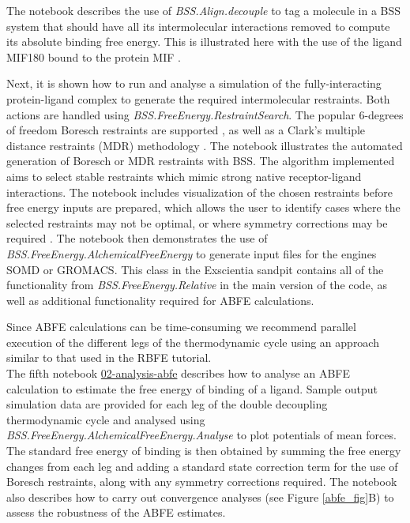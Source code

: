 The notebook describes the use of \textit{BSS.Align.decouple} to tag a molecule in a BSS system that should have all its intermolecular interactions removed to compute its absolute binding free energy. This is illustrated here with the use of the ligand MIF180 bound to the protein MIF \cite{Qian2019, Clark2023}. 

Next, it is shown how to run and analyse a simulation of the fully-interacting protein-ligand complex to generate the required intermolecular restraints. Both actions are handled using \textit{BSS.FreeEnergy.RestraintSearch}. The popular 6-degrees of freedom Boresch restraints are supported \cite{boresch_absolute_2003}, as well as a Clark's multiple distance restraints (MDR) methodology \cite{Clark2023}.
The notebook illustrates the automated generation of Boresch or MDR restraints with BSS. The algorithm implemented aims to select stable restraints which mimic strong native receptor-ligand interactions. The notebook includes visualization of the chosen restraints before free energy inputs are prepared, which allows the user to identify cases where the selected restraints may not be optimal, or where symmetry corrections may be required \cite{duboue-dijon_building_2021}. The notebook then demonstrates the use of \textit{BSS.FreeEnergy.AlchemicalFreeEnergy} to generate input files for the engines SOMD or GROMACS. This class in the Exscientia sandpit contains all of the functionality from \textit{BSS.FreeEnergy.Relative} in the main version of the code, as well as additional functionality required for ABFE calculations.

Since ABFE calculations can be time-consuming we recommend parallel execution of the different legs of the thermodynamic cycle using an approach similar to that used in the RBFE tutorial.
\\

The fifth notebook \href{https://github.com/OpenBioSim/biosimspace_tutorials/blob/main/04_fep/03_ABFE/02_analysis_abfe.ipynb}{02-analysis-abfe} describes how to analyse an ABFE calculation to estimate the free energy of binding of a ligand. Sample output simulation data are provided for each leg of the double decoupling thermodynamic cycle and analysed using \textit{BSS.FreeEnergy.AlchemicalFreeEnergy.Analyse} to plot potentials of mean forces. The standard free energy of binding is then obtained by summing the free energy changes from each leg and adding a standard state correction term for the use of Boresch restraints, along with any symmetry corrections required. The notebook also describes how to carry out convergence analyses (see Figure \ref{abfe_fig}B) to assess the robustness of the ABFE estimates.  

